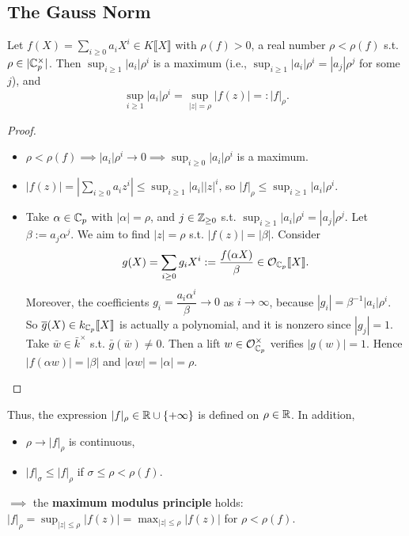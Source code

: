\subsection{The Gauss Norm}
\begin{theorem}
    Let $f(X) = \sum_{i\ge 0} a_iX^i\in K\llbracket X\rrbracket $ with $\rho(f) > 0$, a real number $\rho < \rho(f)$ s.t. $\rho\in |\mathbb{C}_p^\times|$.
    Then $\sup_{i\ge 1}{|a_i|\rho^i}$ is a maximum (i.e., $\sup_{i\ge 1}{|a_i|\rho^i} = |a_j|\rho^j$ for some $j$), and \[\sup_{i\ge 1}{|a_i|\rho^i} = \sup_{|z| = \rho} |f(z)| =: |f|_\rho.\]
\end{theorem}
\begin{proof}
\begin{itemize}
    \item     $\rho<\rho(f)\implies |a_i|\rho^i \to 0\implies \sup_{i\ge 0}{|a_i|\rho^i}$ is a maximum.
    \item $|f(z)| = \left| \sum_{i\ge 0} a_iz^i\right| \le\sup_{i\ge 1} |a_i||z|^i$, so $|f|_\rho\le \sup_{i\ge 1}{|a_i|\rho^i}$.
    \item Take $\alpha\in\mathbb{C}_p$ with $|\alpha| = \rho$,
    and $j\in\mathbb{Z}_{\ge 0}$ s.t. $\sup_{i\ge 1}{|a_i|\rho^i} = |a_j|\rho^j$.
    Let $\beta := a_j\alpha^j$.
    We aim to find $|z| = \rho$ s.t. $|f(z)| = |\beta|$.
    Consider \[g(X) = \sum_{i\ge 0}g_iX^i := \frac{f(\alpha X)}{\beta}\in\mathcal{O}_{\mathbb{C}_p}\llbracket X\rrbracket.\]
    Moreover, the coefficients $g_i = \dfrac{a_i\alpha^i}{\beta}\to 0$ as $i\to\infty$,
    because $|g_i| = \beta^{-1}|a_i|\rho^i$.
    So $\overline{g}(X)\in k_{\mathbb{C}_p}\llbracket X  \rrbracket$ is actually a polynomial, and it is nonzero since $|g_j| = 1$.
    Take $\bar{w}\in\bar{k}^\times$ s.t. $\bar g(\bar w)\ne 0$. Then a lift $w\in\mathcal{O}_{\mathbb{C}_p}^\times$ verifies $|g(w)| = 1$.
    Hence $|f(\alpha w)| = |\beta|$ and $|\alpha w| = |\alpha| = \rho$.\qedhere
\end{itemize}\end{proof}

Thus, the expression $|f|_\rho\in\mathbb{R}\cup\{+\infty\}$ is defined on $\rho\in\mathbb{R}$.
In addition,
\begin{itemize}
    \item $\rho\to |f|_\rho$ is continuous,
    \item $|f|_\sigma \le |f|_\rho$ if $\sigma\le\rho < \rho(f)$.
\end{itemize}
$\implies$ the \textbf{maximum modulus principle} holds: $|f|_\rho = \sup_{|z|\le \rho} |f(z)| = \max_{|z|\le\rho} |f(z)|$ for $\rho < \rho(f)$.

